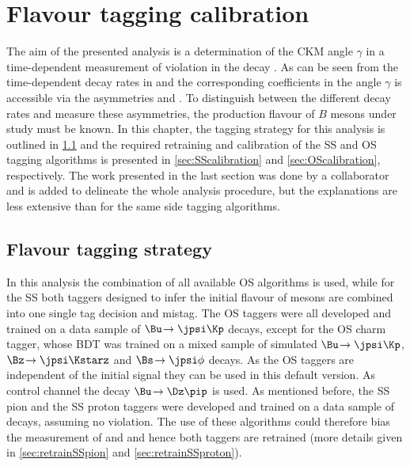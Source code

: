 \chapter{Flavour tagging calibration}
\label{ch:flavourtagging}

The aim of the presented analysis is a determination of the CKM angle $\gamma$ in a time-dependent measurement of \CP violation in the decay \BdToDpi.
As can be seen from the time-dependent decay rates in  and the corresponding coefficients in  the angle $\gamma$ is accessible via the \CP asymmetries \Sf and \Sfbar.
To distinguish between the different decay rates and measure these asymmetries, the production flavour of $B$ mesons under study must be known.
In this chapter, the tagging strategy for this analysis is outlined in \cref{sec:taggingstrategy} and the required retraining and calibration of the SS and OS tagging algorithms is presented in \cref{sec:SScalibration} and \cref{sec:OScalibration}, respectively.
The work presented in the last section was done by a collaborator and is added to delineate the whole analysis procedure, but the explanations are less extensive than for the same side tagging algorithms.

\linespread{1.08}\selectfont
\section{Flavour tagging strategy}
\label{sec:taggingstrategy}

In this analysis the combination of all available OS algorithms is used, while for the SS both taggers designed to infer the initial flavour of \Bz mesons are combined into one single tag decision and mistag.
The OS taggers were all developed and trained on a data sample of $\Bu\!\to\jpsi\Kp$ decays, except for the OS charm tagger, whose BDT was trained on a mixed sample of simulated $\Bu\!\to\jpsi\Kp$, $\Bz\!\to\jpsi\Kstarz$ and $\Bs\!\to\jpsi\phi$ decays.
As the OS taggers are independent of the initial signal \B they can be used in this default version.
As control channel the decay $\Bu\!\to\Dz\pip$ is used.
As mentioned before, the SS pion and the SS proton taggers were developed and trained on a data sample of \BdToDpi decays, assuming no \CP violation.
The use of these algorithms could therefore bias the measurement of \Sf and \Sfbar and hence both taggers are retrained (more details given in \cref{sec:retrainSSpion} and \cref{sec:retrainSSproton}).

